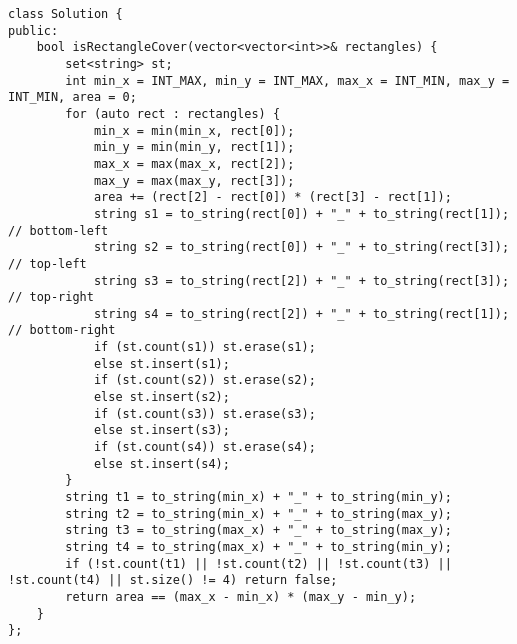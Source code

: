 \begin{lstlisting}
class Solution {
public:
    bool isRectangleCover(vector<vector<int>>& rectangles) {
        set<string> st;
        int min_x = INT_MAX, min_y = INT_MAX, max_x = INT_MIN, max_y = INT_MIN, area = 0;
        for (auto rect : rectangles) {
            min_x = min(min_x, rect[0]);
            min_y = min(min_y, rect[1]);
            max_x = max(max_x, rect[2]);
            max_y = max(max_y, rect[3]);
            area += (rect[2] - rect[0]) * (rect[3] - rect[1]);
            string s1 = to_string(rect[0]) + "_" + to_string(rect[1]); // bottom-left
            string s2 = to_string(rect[0]) + "_" + to_string(rect[3]); // top-left
            string s3 = to_string(rect[2]) + "_" + to_string(rect[3]); // top-right
            string s4 = to_string(rect[2]) + "_" + to_string(rect[1]); // bottom-right
            if (st.count(s1)) st.erase(s1);
            else st.insert(s1);
            if (st.count(s2)) st.erase(s2);
            else st.insert(s2);
            if (st.count(s3)) st.erase(s3);
            else st.insert(s3);
            if (st.count(s4)) st.erase(s4);
            else st.insert(s4);
        }
        string t1 = to_string(min_x) + "_" + to_string(min_y);
        string t2 = to_string(min_x) + "_" + to_string(max_y);
        string t3 = to_string(max_x) + "_" + to_string(max_y);
        string t4 = to_string(max_x) + "_" + to_string(min_y);
        if (!st.count(t1) || !st.count(t2) || !st.count(t3) || !st.count(t4) || st.size() != 4) return false;
        return area == (max_x - min_x) * (max_y - min_y);
    }
};
\end{lstlisting}

